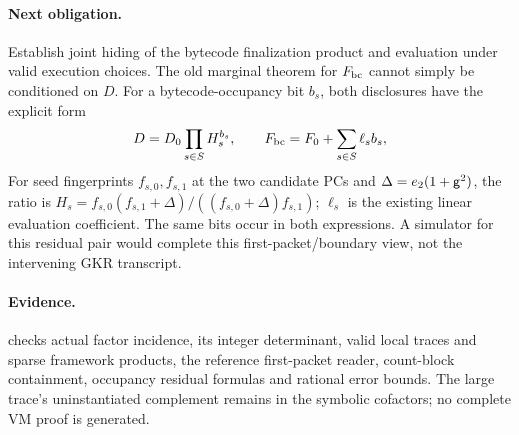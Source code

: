 \paragraph{Next obligation.} Establish joint hiding of the bytecode finalization product and evaluation under valid execution choices. The old marginal theorem for $F_{\rm bc}$ cannot simply be conditioned on $D$. For a bytecode-occupancy bit $b_s$, both disclosures have the explicit form
\[
 D=D_0\prod_{s\in S}H_s^{b_s},\qquad
 F_{\rm bc}=F_0+\sum_{s\in S}\ell_s b_s,
\]
For seed fingerprints $f_{s,0},f_{s,1}$ at the two candidate PCs and $\Delta=e_2(1+\mathsf{g}^2)$, the ratio is $H_s=f_{s,0}(f_{s,1}+\Delta)/((f_{s,0}+\Delta)f_{s,1})$; $\ell_s$ is the existing linear evaluation coefficient. The same bits occur in both expressions. A simulator for this residual pair would complete this first-packet/boundary view, not the intervening GKR transcript.

\paragraph{Evidence.}  checks actual factor incidence, its integer determinant, valid local traces and sparse framework products, the reference first-packet reader, count-block containment, occupancy residual formulas and rational error bounds. The large trace's uninstantiated complement remains in the symbolic cofactors; no complete VM proof is generated.

